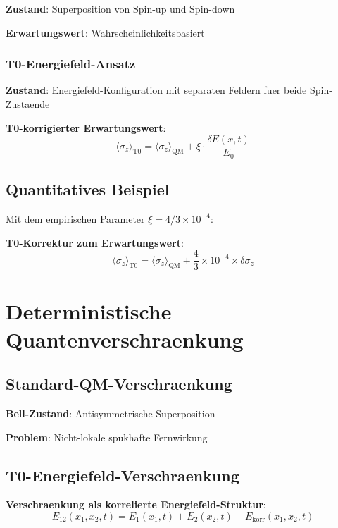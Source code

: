 \documentclass[12pt,a4paper]{article}
\newcommand{\xipar}{\xi}
\begin{document}
	\textbf{Zustand}: Superposition von Spin-up und Spin-down
	
	\textbf{Erwartungswert}: Wahrscheinlichkeitsbasiert
	
	\subsubsection{T0-Energiefeld-Ansatz}
	
	\textbf{Zustand}: Energiefeld-Konfiguration mit separaten Feldern fuer beide Spin-Zustaende
	
	\textbf{T0-korrigierter Erwartungswert}:
	\begin{equation}
		\boxed{\langle \sigma_z \rangle_{\mathrm{T0}} = \langle \sigma_z \rangle_{\mathrm{QM}} + \xipar \cdot \frac{\delta E(x,t)}{E_0}}
		\label{eq:korrigierter_spin_z}
	\end{equation}
	
	\subsection{Quantitatives Beispiel}
	
	Mit dem empirischen Parameter $\xipar = 4/3 \times 10^{-4}$:
	
	\textbf{T0-Korrektur zum Erwartungswert}:
	\begin{equation}
		\langle \sigma_z \rangle_{\mathrm{T0}} = \langle \sigma_z \rangle_{\mathrm{QM}} + \frac{4}{3} \times 10^{-4} \times \delta\sigma_z
	\end{equation}
	
	\section{Deterministische Quantenverschraenkung}
	
	\subsection{Standard-QM-Verschraenkung}
	
	\textbf{Bell-Zustand}: Antisymmetrische Superposition
	
	\textbf{Problem}: Nicht-lokale spukhafte Fernwirkung
	
	\subsection{T0-Energiefeld-Verschraenkung}
	
	\textbf{Verschraenkung als korrelierte Energiefeld-Struktur}:
	\begin{equation}
		\boxed{E_{12}(x_1, x_2, t) = E_1(x_1, t) + E_2(x_2, t) + E_{\mathrm{korr}}(x_1, x_2, t)}
	\end{equation}
	
\end{document}
